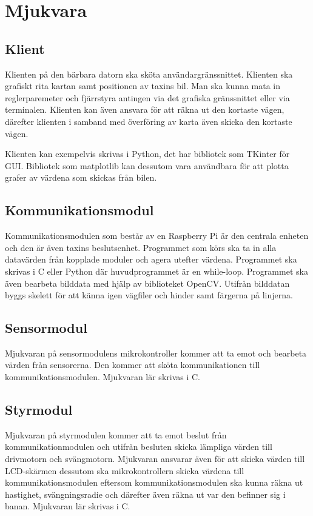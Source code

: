 \documentclass[systemskiss/skiss.tex]{subfiles}
\begin{document}
\section{Mjukvara}
\subsection{Klient}
Klienten på den bärbara datorn ska sköta användargränssnittet. Klienten ska
grafiskt rita kartan samt positionen av taxins bil. Man ska kunna mata in
reglerparemeter och fjärrstyra antingen via det grafiska gränssnittet eller via
terminalen. Klienten kan även ansvara för att räkna ut den kortaste vägen,
därefter klienten i samband med överföring av karta även skicka den
kortaste vägen.

Klienten kan exempelvis skrivas i Python, det har bibliotek som TKinter för
GUI. Bibliotek som matplotlib kan dessutom vara användbara för att plotta
grafer av värdena som skickas från bilen.

\subsection{Kommunikationsmodul}
Kommunikationsmodulen som består av en Raspberry Pi är den centrala enheten och
den är även taxins beslutsenhet. Programmet som körs ska ta in alla datavärden
från kopplade moduler och agera utefter värdena. Programmet ska skrivas i C
eller Python där huvudprogrammet är en while-loop. Programmet ska även bearbeta
bilddata med hjälp av biblioteket OpenCV. Utifrån bilddatan byggs skelett för
att känna igen vägfiler och hinder samt färgerna på linjerna.

\subsection{Sensormodul}
Mjukvaran på sensormodulens mikrokontroller kommer att ta emot och bearbeta
värden från sensorerna. Den kommer att sköta kommunikationen till
kommunikationsmodulen. Mjukvaran lär skrivas i C.


\subsection{Styrmodul}
Mjukvaran på styrmodulen kommer att ta emot beslut från kommunikationmodulen och
utifrån besluten skicka lämpliga värden till drivmotorn och svängmotorn.
Mjukvaran ansvarar även för att skicka värden till LCD-skärmen dessutom ska 
mikrokontrollern skicka värdena till kommunikationsmodulen eftersom
kommunikationsmodulen ska kunna räkna ut hastighet, svängningsradie och
därefter även räkna ut var den befinner sig i banan. Mjukvaran lär skrivas i C.
 
\end{document}
